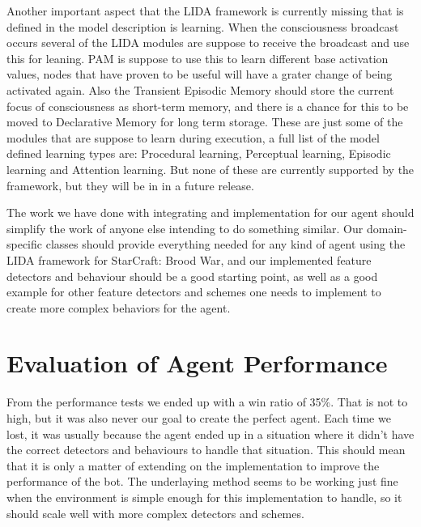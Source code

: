 Another important aspect that the LIDA framework is currently missing that is defined in the model description is learning. When the consciousness broadcast occurs several of the LIDA modules are suppose to receive the broadcast and use this for leaning. PAM is suppose to use this to learn different base activation values, nodes that have proven to be useful will have a grater change of being activated again. Also the Transient Episodic Memory should store the current focus of consciousness as short-term memory, and there is a chance for this to be moved to Declarative Memory for long term storage. These are just some of the modules that are suppose to learn during execution, a full list of the model defined learning types are: Procedural learning, Perceptual learning, Episodic learning and Attention learning. But none of these are currently supported by the framework, but they will be in in a future release.

The work we have done with integrating and  implementation for our agent should simplify the work of anyone else intending to do something similar. Our domain-specific classes should provide everything needed for any kind of agent using the LIDA framework for StarCraft: Brood War, and our implemented feature detectors and behaviour should be a good starting point, as well as a good example for other feature detectors and schemes one needs to implement to create more complex behaviors for the agent.

\section{Evaluation of Agent Performance}
\label{sec:evalperf}
From the performance tests we ended up with a win ratio of 35\%. That is not to high, but it was also never our goal to create the perfect agent. Each time we lost, it was usually because the agent ended up in a situation where it didn't have the correct detectors and behaviours to handle that situation. This should mean that it is only a matter of extending on the implementation to improve the performance of the bot. The underlaying method seems to be working just fine when the environment is simple enough for this implementation to handle, so it should scale well with more complex detectors and schemes. 

